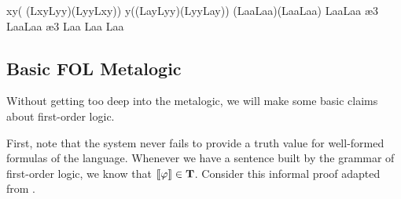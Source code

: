 \begin{fitchproof}
  \open
   {\eexists x\eforall y(
    (Lxy\eif\enot Lyy)\eand(\enot Lyy\eif Lxy))}                   
  \open
   {\eforall y((Lay\eif\enot Lyy)\eand(\enot Lyy\eif Lay))} 
   {(Laa\eif\enot Laa)\eand(\enot Laa\eif Laa)}             
   {Laa\eif\enot Laa}                                       \ae{3}
   {\enot Laa\eif Laa}                                      \ae{3}
  \open
   {Laa}                                                    
   {\enot Laa}                                              
   {\ebot}                                                  
  \close
   {\enot Laa}                                              
                                                      
                                                    
  \close
                                                    
  \close
                     

\end{fitchproof}

\subsection{Basic FOL Metalogic}

Without getting too deep into the metalogic, we will make some basic claims
about first-order logic.

First, note that the system never fails to provide a truth value for well-formed
formulas of the language. Whenever we have a sentence \ephi built by the grammar
of first-order logic, we know that $\llbracket\varphi\rrbracket\in\mathbf{T}$. Consider
this informal proof adapted from \cite[][pp. 342-343]{Smi20}.

